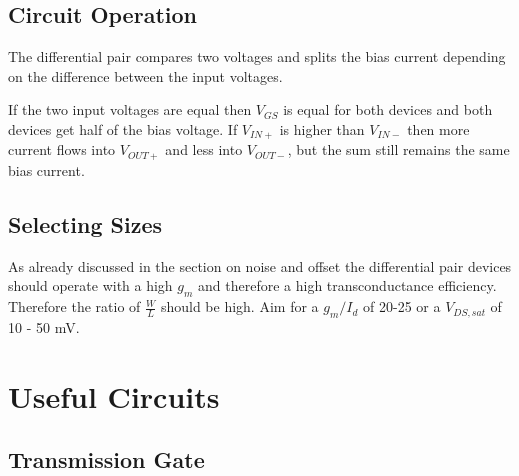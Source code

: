 \documentclass[11pt]{article}
\begin{document}
\begin{figure}[h]
\end{figure}


\subsection{Circuit Operation}

The differential pair compares two voltages and splits the bias current depending on the difference between the input voltages. 

If the two input voltages are equal then $V_{GS}$ is equal for both devices and both devices get half of the bias voltage. If $V_{IN+}$ is higher than $V_{IN-}$ then more current flows into $V_{OUT+}$ and less into $V_{OUT-}$, but the sum still remains the same bias current.

\subsection{Selecting Sizes}

As already discussed in the section on noise and offset the differential pair devices should operate with a high $g_m$ and therefore a high transconductance efficiency. Therefore the ratio of $\frac{W}{L}$ should be high. Aim for a $g_m/I_d$ of 20-25 or a $V_{DS,sat}$ of 10 - 50 mV.

\newpage
\section{Useful Circuits}

\subsection{Transmission Gate}
\end{document}
